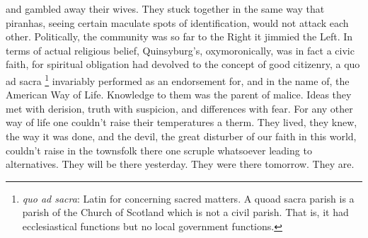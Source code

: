 and gambled away their
wives. They stuck together in the same way that piranhas, 
seeing certain maculate 
spots of identification, would not attack each other. Politically, the
community was so far to the Right it jimmied 
the Left. In terms of actual religious belief, Quinsyburg's, oxymoronically, 
was in fact a civic faith, for spiritual obligation had devolved 
to the concept of good citizenry, a quo ad sacra 
\footnote{ \textit{quo ad sacra}: Latin for concerning sacred matters. A quoad
sacra parish is a parish of the Church of Scotland which is not a civil parish.
That is, it had ecclesiastical functions but no local government functions.
}
invariably performed as an endorsement for, and in the name of, the
American Way of Life. Knowledge to them was the parent of malice. 
Ideas they met with derision, 
truth with suspicion, and differences with fear. For any other
way of life one couldn't raise their temperatures a therm. 
They lived, they
knew, the way it was done, and the devil, the great disturber of our faith in
this world, couldn't raise in the townsfolk there one scruple whatsoever leading
to alternatives. They will be there yesterday. They were there tomorrow. They
are.

